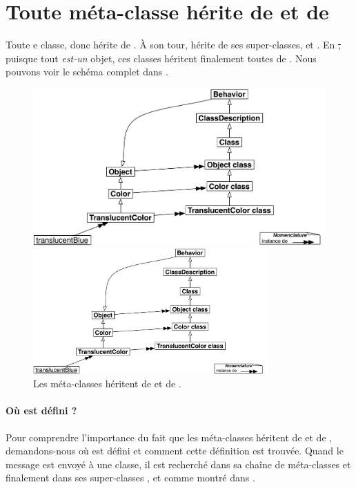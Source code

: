\documentclass[a4paper,10pt,twoside]{book}
\begin{document}
\section{Toute m{\'e}ta-classe h{\'e}rite de  et de }

Toute  e classe, donc hérite de .
À son tour,  hérite de ses super-classes,  et .
En \st, puisque tout \emph{est-un} objet, ces classes héritent finalement toutes de .
Nous pouvons voir le schéma complet dans .

\begin{center}
\begin{figure}
\ifluluelse
	{\centerline{\includegraphics[width=\textwidth]{TranslucentBehavior}}}
	{\centerline{\includegraphics[width=0.8\textwidth]{TranslucentBehavior}}}
\caption{Les méta-classes héritent de  et de .\label{fig:inheritbehavior}}
\end{figure}
\end{center}


\paragraph{Où est défini ?}
Pour comprendre l'importance du fait que les méta-classes héritent de  et de , 
demandons-nous
où est défini  et comment cette définition est trouvée.
Quand le message  est envoyé à une classe, il est recherché dans sa chaîne de méta-classes et finalement dans ses super-classes ,  et  comme montré dans .
\end{document}
